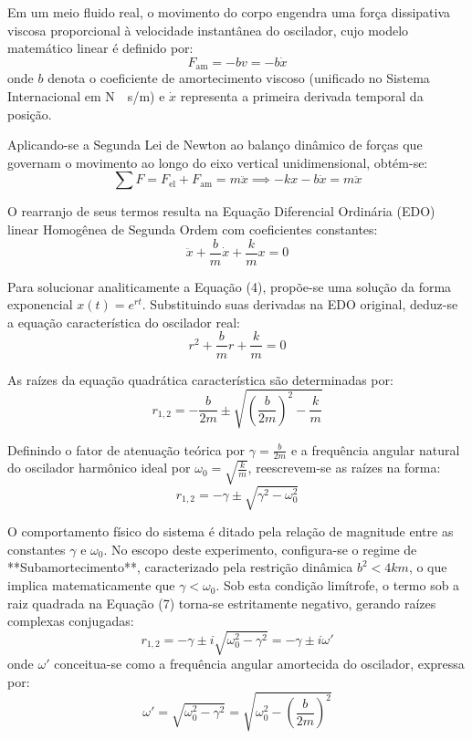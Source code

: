 \documentclass[12pt, a4paper]{article}
\begin{document}
Em um meio fluido real, o movimento do corpo engendra uma força dissipativa viscosa proporcional à velocidade instantânea do oscilador, cujo modelo matemático linear é definido por:
\begin{equation}
    F_{\text{am}} = -bv = -b\dot{x}
\end{equation}
onde $b$ denota o coeficiente de amortecimento viscoso (unificado no Sistema Internacional em \si{\newton\cdot\second/\meter}) e $\dot{x}$ representa a primeira derivada temporal da posição.

Aplicando-se a Segunda Lei de Newton ao balanço dinâmico de forças que governam o movimento ao longo do eixo vertical unidimensional, obtém-se:
\begin{equation}
    \sum F = F_{\text{el}} + F_{\text{am}} = m\ddot{x} \implies -kx - b\dot{x} = m\ddot{x}
\end{equation}

O rearranjo de seus termos resulta na Equação Diferencial Ordinária (EDO) linear Homogênea de Segunda Ordem com coeficientes constantes:
\begin{equation}
    \ddot{x} + \frac{b}{m}\dot{x} + \frac{k}{m}x = 0
\end{equation}

Para solucionar analiticamente a Equação (4), propõe-se uma solução da forma exponencial $x(t) = e^{rt}$. Substituindo suas derivadas na EDO original, deduz-se a equação característica do oscilador real:
\begin{equation}
    r^2 + \frac{b}{m}r + \frac{k}{m} = 0
\end{equation}

As raízes da equação quadrática característica são determinadas por:
\begin{equation}
    r_{1,2} = -\frac{b}{2m} \pm \sqrt{\left(\frac{b}{2m}\right)^2 - \frac{k}{m}}
\end{equation}

Definindo o fator de atenuação teórica por $\gamma = \frac{b}{2m}$ e a frequência angular natural do oscilador harmônico ideal por $\omega_0 = \sqrt{\frac{k}{m}}$, reescrevem-se as raízes na forma:
\begin{equation}
    r_{1,2} = -\gamma \pm \sqrt{\gamma^2 - \omega_0^2}
\end{equation}

O comportamento físico do sistema é ditado pela relação de magnitude entre as constantes $\gamma$ e $\omega_0$. No escopo deste experimento, configura-se o regime de **Subamortecimento**, caracterizado pela restrição dinâmica $b^2 < 4km$, o que implica matematicamente que $\gamma < \omega_0$. Sob esta condição limítrofe, o termo sob a raiz quadrada na Equação (7) torna-se estritamente negativo, gerando raízes complexas conjugadas:
\begin{equation}
    r_{1,2} = -\gamma \pm i\sqrt{\omega_0^2 - \gamma^2} = - \gamma \pm i\omega'
\end{equation}
onde $\omega'$ conceitua-se como a frequência angular amortecida do oscilador, expressa por:
\begin{equation}
    \omega' = \sqrt{\omega_0^2 - \gamma^2} = \sqrt{\omega_0^2 - \left(\frac{b}{2m}\right)^2}
\end{equation}
\end{document}
